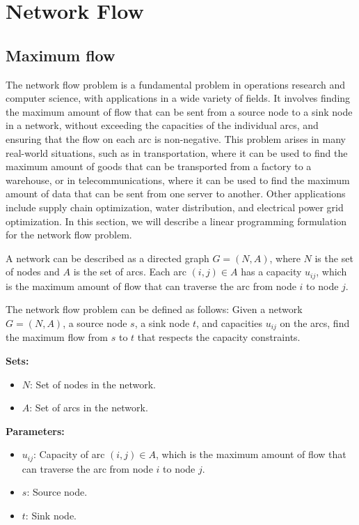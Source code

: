 {\newpage







\section{Network Flow}
\todoSection{}

\subsection{Maximum flow}

The network flow problem is a fundamental problem in operations research and computer science, with applications in a wide variety of fields. It involves finding the maximum amount of flow that can be sent from a source node to a sink node in a network, without exceeding the capacities of the individual arcs, and ensuring that the flow on each arc is non-negative. This problem arises in many real-world situations, such as in transportation, where it can be used to find the maximum amount of goods that can be transported from a factory to a warehouse, or in telecommunications, where it can be used to find the maximum amount of data that can be sent from one server to another. Other applications include supply chain optimization, water distribution, and electrical power grid optimization. In this section, we will describe a linear programming formulation for the network flow problem.

A network can be described as a directed graph \( G = (N, A) \), where \( N \) is the set of nodes and \( A \) is the set of arcs. Each arc \( (i, j) \in A \) has a capacity \( u_{ij} \), which is the maximum amount of flow that can traverse the arc from node \( i \) to node \( j \).

The network flow problem can be defined as follows: Given a network \( G = (N, A) \), a source node \( s \), a sink node \( t \), and capacities \( u_{ij} \) on the arcs, find the maximum flow from \( s \) to \( t \) that respects the capacity constraints.

\noindent \textbf{Sets:}
\begin{itemize}
\item \( N \): Set of nodes in the network.
\item \( A \): Set of arcs in the network.
\end{itemize}

\noindent \textbf{Parameters:}
\begin{itemize}
\item \( u_{ij} \): Capacity of arc \( (i, j) \in A \), which is the maximum amount of flow that can traverse the arc from node \( i \) to node \( j \).
\item \( s \): Source node.
\item \( t \): Sink node.
\end{itemize}

}
